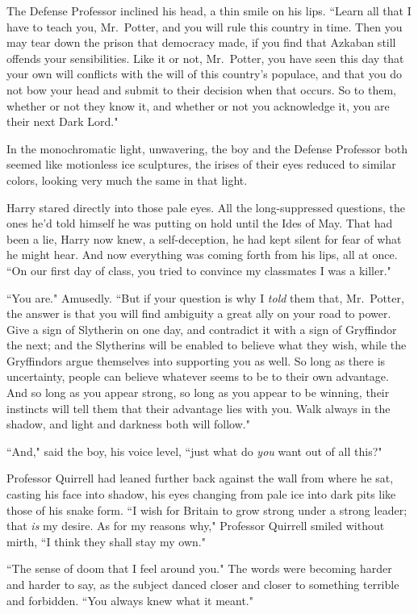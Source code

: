 The Defense Professor inclined his head, a thin smile on his lips. ``Learn all that I have to teach you, Mr.~Potter, and you will rule this country in time. Then you may tear down the prison that democracy made, if you find that Azkaban still offends your sensibilities. Like it or not, Mr.~Potter, you have seen this day that your own will conflicts with the will of this country's populace, and that you do not bow your head and submit to their decision when that occurs. So to them, whether or not they know it, and whether or not you acknowledge it, you are their next Dark Lord."

In the monochromatic light, unwavering, the boy and the Defense Professor both seemed like motionless ice sculptures, the irises of their eyes reduced to similar colors, looking very much the same in that light.

Harry stared directly into those pale eyes. All the long-suppressed questions, the ones he'd told himself he was putting on hold until the Ides of May. That had been a lie, Harry now knew, a self-deception, he had kept silent for fear of what he might hear. And now everything was coming forth from his lips, all at once. ``On our first day of class, you tried to convince my classmates I was a killer."

``You are." Amusedly. ``But if your question is why I \emph{told} them that, Mr.~Potter, the answer is that you will find ambiguity a great ally on your road to power. Give a sign of Slytherin on one day, and contradict it with a sign of Gryffindor the next; and the Slytherins will be enabled to believe what they wish, while the Gryffindors argue themselves into supporting you as well. So long as there is uncertainty, people can believe whatever seems to be to their own advantage. And so long as you appear strong, so long as you appear to be winning, their instincts will tell them that their advantage lies with you. Walk always in the shadow, and light and darkness both will follow."

``And," said the boy, his voice level, ``just what do \emph{you} want out of all this?"

Professor Quirrell had leaned further back against the wall from where he sat, casting his face into shadow, his eyes changing from pale ice into dark pits like those of his snake form. ``I wish for Britain to grow strong under a strong leader; that \emph{is} my desire. As for my reasons why," Professor Quirrell smiled without mirth, ``I think they shall stay my own."

``The sense of doom that I feel around you." The words were becoming harder and harder to say, as the subject danced closer and closer to something terrible and forbidden. ``You always knew what it meant."


